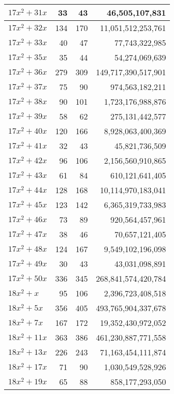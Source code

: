 \documentclass[a4paper]{amsproc}
\theoremstyle{plain}
\theoremstyle{named}
\begin{document}
\begin{longtable}{ | l | r | r | r | }
$17x^2 + 31x$ & 33 & 43 & 46{,}505{,}107{,}831 \\ \hline
$17x^2 + 32x$ & 134 & 170 & 11{,}051{,}512{,}253{,}761 \\ \hline
$17x^2 + 33x$ & 40 & 47 & 77{,}743{,}322{,}985 \\ \hline
$17x^2 + 35x$ & 35 & 44 & 54{,}274{,}069{,}639 \\ \hline
$17x^2 + 36x$ & 279 & 309 & 149{,}717{,}390{,}517{,}901 \\ \hline
$17x^2 + 37x$ & 75 & 90 & 974{,}563{,}182{,}211 \\ \hline
$17x^2 + 38x$ & 90 & 101 & 1{,}723{,}176{,}988{,}876 \\ \hline
$17x^2 + 39x$ & 58 & 62 & 275{,}131{,}442{,}577 \\ \hline
$17x^2 + 40x$ & 120 & 166 & 8{,}928{,}063{,}400{,}369 \\ \hline
$17x^2 + 41x$ & 32 & 43 & 45{,}821{,}736{,}509 \\ \hline
$17x^2 + 42x$ & 96 & 106 & 2{,}156{,}560{,}910{,}865 \\ \hline
$17x^2 + 43x$ & 61 & 84 & 610{,}121{,}641{,}405 \\ \hline
$17x^2 + 44x$ & 128 & 168 & 10{,}114{,}970{,}183{,}041 \\ \hline
$17x^2 + 45x$ & 123 & 142 & 6{,}365{,}319{,}733{,}983 \\ \hline
$17x^2 + 46x$ & 73 & 89 & 920{,}564{,}457{,}961 \\ \hline
$17x^2 + 47x$ & 38 & 46 & 70{,}657{,}121{,}405 \\ \hline
$17x^2 + 48x$ & 124 & 167 & 9{,}549{,}102{,}196{,}098 \\ \hline
$17x^2 + 49x$ & 30 & 43 & 43{,}031{,}098{,}891 \\ \hline
$17x^2 + 50x$ & 336 & 345 & 268{,}841{,}574{,}420{,}784 \\ \hline
$18x^2 + x$ & 95 & 106 & 2{,}396{,}723{,}408{,}518 \\ \hline
$18x^2 + 5x$ & 356 & 405 & 493{,}765{,}904{,}337{,}678 \\ \hline
$18x^2 + 7x$ & 167 & 172 & 19{,}352{,}430{,}972{,}052 \\ \hline
$18x^2 + 11x$ & 363 & 386 & 461{,}230{,}887{,}771{,}558 \\ \hline
$18x^2 + 13x$ & 226 & 243 & 71{,}163{,}454{,}111{,}874 \\ \hline
$18x^2 + 17x$ & 71 & 90 & 1{,}030{,}549{,}528{,}926 \\ \hline
$18x^2 + 19x$ & 65 & 88 & 858{,}177{,}293{,}050 \\ \hline

\end{longtable}
\end{document}
